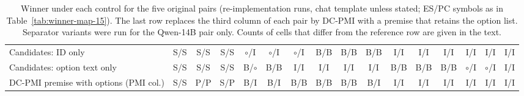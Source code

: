 \begin{table}[t]
\begin{tabular}{@{}lccccccccccccccc@{}}
Candidates: ID only & S/S & S/S & S/S & $\circ$/I & $\circ$/I & $\circ$/I & B/B & B/B & B/B & I/I & I/I & I/I & I/I & I/I & I/I \\
Candidates: option text only & S/S & S/S & S/S & B/$\circ$ & B/B & I/I & I/I & I/I & I/I & B/B & B/B & B/B & $\circ$/I & $\circ$/I & I/I \\
DC-PMI premise with options (PMI col.) & S/S & P/P & S/P & B/I & B/I & B/B & B/B & B/B & B/I & I/I & I/I & I/I & I/I & I/I & I/I \\
\bottomrule
\end{tabular}
\caption{Winner under each control for the five original pairs (re-implementation runs, chat template unless stated; ES/PC symbols as in Table~\ref{tab:winner-map-15}). The last row replaces the third column of each pair by DC-PMI with a premise that retains the option list. Separator variants were run for the Qwen-14B pair only. Counts of cells that differ from the reference row are given in the text.}
\label{tab:controls-map}
\end{table}
